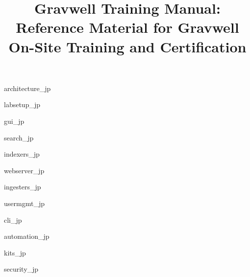 \documentclass[]{report}
\date{}
\newcommand{\titlepicture}[2][]{%
  \renewcommand\placetitlepicture{%
    \texttt{[image: \#2]}\par\medskip
  }%
}
\newcommand{\placetitlepicture}{} %
\begin{document}
\titlepicture{img/logo.png}
\title{Gravwell Training Manual: Reference Material for Gravwell On-Site Training and Certification}
\maketitle

\newpage

\tableofcontents
\newpage




{architecture_jp}

{labsetup_jp}

{gui_jp}

{search_jp}

{indexers_jp}

{webserver_jp}

{ingesters_jp}

{usermgmt_jp}

{cli_jp}

{automation_jp}

{kits_jp}

{security_jp}

\end{document}
